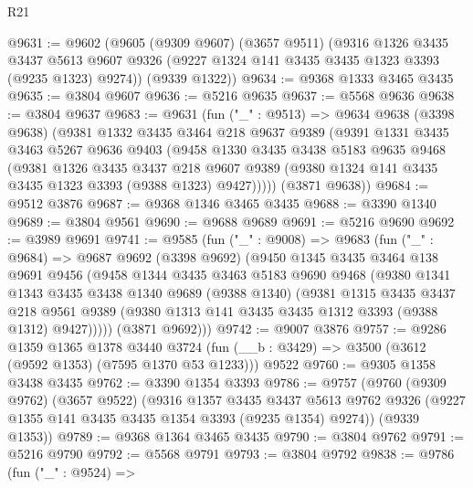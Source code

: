 \begin{lexlean}{R21}
\begin{coremodule}
@9631 := @9602
    (@9605
      (@9309 @9607)
      (@3657 @9511)
      (@9316
        @1326
        @3435
        @3437
        @5613
        @9607
        @9326
        (@9227 @1324 @141 @3435 @3435 @1323 @3393 (@9235 @1323) @9274))
      (@9339 @1322))
@9634 := @9368 @1333 @3465 @3435
@9635 := @3804 @9607
@9636 := @5216 @9635
@9637 := @5568 @9636
@9638 := @3804 @9637
@9683 := @9631
    (fun ("_" : @9513) =>
    @9634
      @9638
      (@3398 @9638)
      (@9381
        @1332
        @3435
        @3464
        @218
        @9637
        @9389
        (@9391
          @1331
          @3435
          @3463
          @5267
          @9636
          @9403
          (@9458
            @1330
            @3435
            @3438
            @5183
            @9635
            @9468
            (@9381
              @1326
              @3435
              @3437
              @218
              @9607
              @9389
              (@9380 @1324 @141 @3435 @3435 @1323 @3393 (@9388 @1323) @9427)))))
      (@3871 @9638))
@9684 := @9512 @3876
@9687 := @9368 @1346 @3465 @3435
@9688 := @3390 @1340
@9689 := @3804 @9561
@9690 := @9688 @9689
@9691 := @5216 @9690
@9692 := @3989 @9691
@9741 := @9585
    (fun ("_" : @9008) =>
    @9683
      (fun ("_" : @9684) =>
      @9687
        @9692
        (@3398 @9692)
        (@9450
          @1345
          @3435
          @3464
          @138
          @9691
          @9456
          (@9458
            @1344
            @3435
            @3463
            @5183
            @9690
            @9468
            (@9380
              @1341
              @1343
              @3435
              @3438
              @1340
              @9689
              (@9388 @1340)
              (@9381
                @1315
                @3435
                @3437
                @218
                @9561
                @9389
                (@9380 @1313 @141 @3435 @3435 @1312 @3393 (@9388 @1312) @9427)))))
        (@3871 @9692)))
@9742 := @9007 @3876
@9757 := @9286
    @1359
    @1365
    @1378
    @3440
    @3724
    (fun (__b : @3429) => @3500 (@3612 (@9592 @1353) (@7595 @1370 @53 @1233)))
    @9522
@9760 := @9305 @1358 @3438 @3435
@9762 := @3390 @1354 @3393
@9786 := @9757
    (@9760
      (@9309 @9762)
      (@3657 @9522)
      (@9316
        @1357
        @3435
        @3437
        @5613
        @9762
        @9326
        (@9227 @1355 @141 @3435 @3435 @1354 @3393 (@9235 @1354) @9274))
      (@9339 @1353))
@9789 := @9368 @1364 @3465 @3435
@9790 := @3804 @9762
@9791 := @5216 @9790
@9792 := @5568 @9791
@9793 := @3804 @9792
@9838 := @9786
    (fun ("_" : @9524) =>

\end{coremodule}
\end{lexlean}

